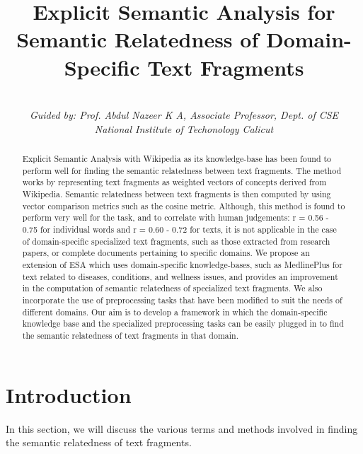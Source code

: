 \documentclass[journal,transmag]{IEEEtran}
\begin{document}
\title{Explicit Semantic Analysis for Semantic Relatedness of Domain-Specific Text Fragments}

\author{
    \\
   \emph{Guided by: Prof. Abdul Nazeer K A, Associate Professor, Dept. of CSE\\National Institute of Techonology Calicut}
}

\maketitle

\begin{abstract}
Explicit Semantic Analysis with Wikipedia as its knowledge-base has been found to perform well for finding the semantic relatedness between text fragments. The method works by representing text fragments as weighted vectors of concepts derived from Wikipedia. Semantic relatedness between text fragments is then computed by using vector comparison metrics such as the cosine metric. Although, this method is found to perform very well for the task, and to correlate with human judgements: r = 0.56 - 0.75 for individual words and r = 0.60 - 0.72 for texts, it is not applicable in the case of domain-specific specialized text fragments, such as those extracted from research papers, or complete documents pertaining to specific domains. We propose an extension of ESA which uses domain-specific knowledge-bases, such as MedlinePlus for text related to diseases, conditions, and wellness issues, and provides an improvement in the computation of semantic relatedness of specialized text fragments. We also incorporate the use of preprocessing tasks that have been modified to suit the needs of different domains. Our aim is to develop a framework in which the domain-specific knowledge base and the specialized preprocessing tasks can be easily plugged in to find the semantic relatedness of text fragments in that domain.
\end{abstract}

\section{\textbf{Introduction}}
In this section, we will discuss the various terms and methods involved in finding the semantic relatedness of text fragments.
\end{document}
